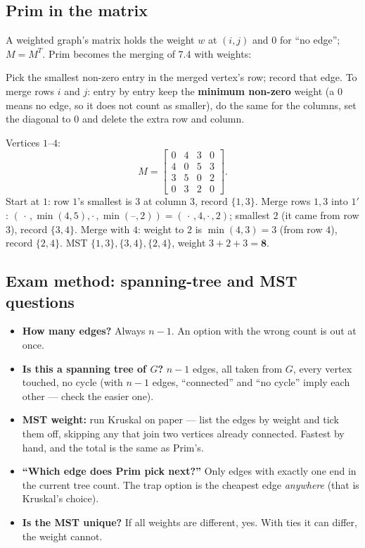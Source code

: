 \documentclass{fkt-notes}
\theoremstyle{definition}
\begin{document}
\subsection{Prim in the matrix}
%
A weighted graph's matrix holds the weight $w$ at $(i,j)$ and $0$ for
``no edge''; $M=M^T$. Prim becomes the merging of 7.4 with weights:
\begin{rulepar}
  Pick the smallest non-zero entry in the merged vertex's row; record that
  edge. To merge rows $i$ and $j$: entry by entry keep the
  \textbf{minimum non-zero} weight (a $0$ means no edge, so it does not
  count as smaller), do the same for the columns, set the diagonal to $0$
  and delete the extra row and column.
\end{rulepar}
\begin{example}
  Vertices $1$--$4$:
  \[
    M=\begin{bmatrix}0&4&3&0\\4&0&5&3\\3&5&0&2\\0&3&2&0\end{bmatrix}.
  \]
  Start at $1$: row $1$'s smallest is $3$ at column $3$, record $\{1,3\}$.
  Merge rows $1,3$ into $1'$: $(\,\cdot\,,\min(4,5),\cdot\,,\min(\text{--},2))
    =(\,\cdot\,,4,\cdot\,,2)$; smallest $2$ (it came from row $3$), record
  $\{3,4\}$. Merge with $4$: weight to $2$ is $\min(4,3)=3$ (from row
  $4$), record $\{2,4\}$. MST $\{1,3\},\{3,4\},\{2,4\}$, weight
  $3+2+3=\mathbf{8}$.
\end{example}

\subsection{Exam method: spanning-tree and MST questions}
%
\begin{itemize}[nosep]
  \item \textbf{How many edges?} Always $n-1$. An option with the wrong
        count is out at once.
  \item \textbf{Is this a spanning tree of $G$?} $n-1$ edges, all taken
        from $G$, every vertex touched, no cycle (with $n-1$ edges,
        ``connected'' and ``no cycle'' imply each other --- check the
        easier one).
  \item \textbf{MST weight:} run Kruskal on paper --- list the edges by
        weight and tick them off, skipping any that join two vertices
        already connected. Fastest by hand, and the total is the same as
        Prim's.
  \item \textbf{``Which edge does Prim pick next?''} Only edges with
        exactly one end in the current tree count. The trap option is the
        cheapest edge \emph{anywhere} (that is Kruskal's choice).
  \item \textbf{Is the MST unique?} If all weights are different, yes.
        With ties it can differ, the weight cannot.
\end{itemize}
\end{document}
